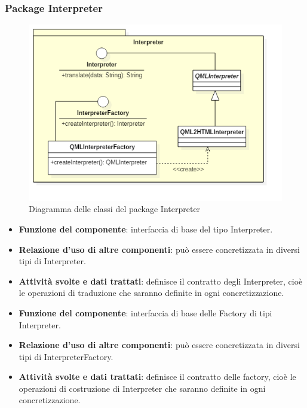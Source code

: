 \subsubsection{Package Interpreter}
\begin{figure}[h!]
\begin{center}
	\includegraphics[scale=0.65]{../images/InterpreterClass.png}
	\caption{Diagramma delle classi del package Interpreter}
\end{center}
\end{figure}
\begin{itemize}
	\item\textbf{Funzione del componente}: interfaccia di base del tipo Interpreter.
	\item\textbf{Relazione d'uso di altre componenti}: può essere concretizzata in diversi tipi di Interpreter.
	\item\textbf{Attività svolte e dati trattati}: definisce il contratto degli Interpreter, cioè le operazioni di traduzione che saranno definite in ogni concretizzazione.
\end{itemize}
\begin{itemize}
	\item\textbf{Funzione del componente}: interfaccia di base delle Factory di tipi Interpreter.
	\item\textbf{Relazione d'uso di altre componenti}: può essere concretizzata in diversi tipi di InterpreterFactory.
	\item\textbf{Attività svolte e dati trattati}: definisce il contratto delle factory, cioè le operazioni di costruzione di Interpreter che saranno definite in ogni concretizzazione.
\end{itemize}
